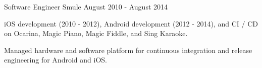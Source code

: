\begin{cventries}
  \cventry
    {Software Engineer} %
    {Smule} %
    {} %
    {August 2010 - August 2014} %
    {
      \begin{cvitems} %
       \item {iOS development (2010 - 2012), Android development (2012 - 2014), and CI / CD on Ocarina, Magic Piano, Magic Fiddle, and Sing Karaoke.}
      \item {Managed hardware and software platform for continuous integration and release engineering for Android and iOS.}
      \end{cvitems}
    }


\end{cventries}
